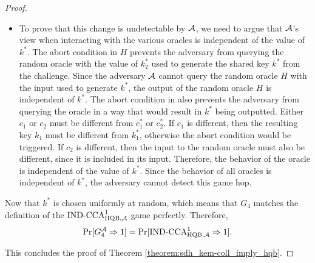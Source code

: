 \begin{proof}
\begin{itemize}
                                                                                        \item[\emph{Proof}]
                                                                                            To prove that this change is undetectable by $\mathcal{A}$, we need to argue that $\mathcal{A}$'s view when interacting with the various oracles is independent of the value of $k^*$.
                                                                                            The abort condition in $H$ prevents the adversary from querying the random oracle with the value of $k^*_2$ used to generate the shared key $k^*$ from the challenge.
                                                                                            Since the adversary $\mathcal{A}$ cannot query the random oracle $H$ with the input used to generate $k^*$, the output of the random oracle $H$ is independent of $k^*$.
                                                                                            The abort condition in \dec also prevents the adversary from querying the \dec oracle in a way that would result in $k^*$ being outputted.
                                                                                            Either $c_1$ or $c_2$ must be different from $c^*_1$ or $c^*_2$.
                                                                                            If $c_1$ is different, then the resulting key $k_1$ must be different from $k^*_1$, otherwise the abort condition would be triggered.
                                                                                            If $c_2$ is different, then the input to the random oracle must also be different, since it is included in its input.
                                                                                            Therefore, the behavior of the \dec oracle is independent of the value of $k^*$.
                                                                                            Since the behavior of all oracles is independent of $k^*$, the adversary cannot detect this game hop.
                                                                                        \end{itemize}

                                                                                    \item Now that $k^*$ is chosen uniformly at random, which means that $G_4$ matches the definition of the $\text{IND-CCA}^1_{\text{HQB},\mathcal{A}}$ game perfectly. Therefore,
                                                                                        \[ \Pr[G^{\mathcal{A}}_4 \Rightarrow 1] = \Pr[\text{IND-CCA}^1_{\text{HQB},\mathcal{A}} \Rightarrow 1]. \]

                                                                                    \item This concludes the proof of Theorem \ref{theorem:sdh_kem-coll_imply_hqb}.

                                                                                    \end{proof}
